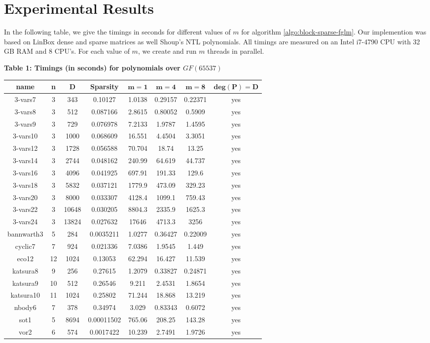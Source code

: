 \documentclass[12pt]{article}
\begin{document}
\section{Experimental Results}\label{section:ex}
In the following table, we give the timings in seconds for different values 
of $m$ for algorithm \ref{algo:block-sparse-fglm}. 
Our implemention was based on LinBox \cite{LinBox} dense and 
sparse matrices as well Shoup's NTL \cite{NTL} polynomials. All timings
are measured on an Intel i7-4790 CPU with 32 GB RAM and 8 CPU's. For each
value of $m$, we create and run $m$ threads in parallel.
\bgroup
\def\arraystretch{1.5}
\setlength\tabcolsep{10pt}
\begin{center}
	\textbf{Table 1: Timings (in seconds) for polynomials over $GF(65537)$}
\begin{tabular}{c|c|c|c|c|c|c|c}
	\textbf{name}& n& $\mathbf{D}$ & \textbf{Sparsity} & $\mathbf{m = 1}$ & $\mathbf{m = 4}$ & $\mathbf{m = 8}$ & $\mathbf{deg(P) = D}$\\
	\hline
	3-vars7&3 &343&0.10127&1.0138&0.29157&0.22371&yes\\
	3-vars8&3 &512&0.087166&2.8615&0.80052&0.5909&yes\\
	3-vars9&3 &729&0.076978&7.2133&1.9787&1.4595&yes\\
	3-vars10&3 &1000&0.068609&16.551&4.4504&3.3051&yes\\
	3-vars12&3 &1728&0.056588&70.704&18.74&13.25&yes\\
	3-vars14&3 &2744&0.048162&240.99&64.619&44.737&yes\\
	3-vars16&3 &4096&0.041925&697.91&191.33&129.6&yes\\
	3-vars18&3 &5832&0.037121&1779.9&473.09&329.23&yes\\
	3-vars20&3 &8000&0.033307&4128.4&1099.1&759.43&yes\\
	3-vars22&3 &10648&0.030205&8804.3&2335.9&1625.3&yes\\
	3-vars24&3 &13824&0.027632&17646&4713.3&3256&yes\\
	bannwarth3&5 &284&0.0035211&1.0277&0.36427&0.22009&yes\\
	cyclic7&7 &924&0.021336&7.0386&1.9545&1.449&yes\\
	eco12&12 &1024&0.13053&62.294&16.427&11.539&yes\\
	katsura8&9 &256&0.27615&1.2079&0.33827&0.24871&yes\\
	katsura9&10 &512&0.26546&9.211&2.4531&1.8654&yes\\
	katsura10&11 &1024&0.25802&71.244&18.868&13.219&yes\\
	nbody6&7 &378&0.34974&3.029&0.83343&0.6072&yes\\
	sot1&5 &8694&0.00011502&765.06&208.25&143.28&yes\\
	vor2&6 &574&0.0017422&10.239&2.7491&1.9726&yes\\
	
\end{tabular}
\end{center}
\end{document}

